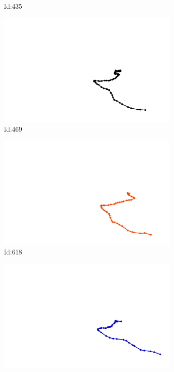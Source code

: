 \documentclass[12pt,twoside]{report}
\begin{document}
\begin{figure}
\begin{subfigure}[b]{0.20\textwidth}
\caption{Id:435}
\end{subfigure}
\begin{subfigure}[b]{0.20\textwidth}
\centering
\includegraphics[width=\textwidth]{../../trajectories/469.png}
\caption{Id:469}
\end{subfigure}
\begin{subfigure}[b]{0.20\textwidth}
\centering
\includegraphics[width=\textwidth]{../../trajectories/618.png}
\caption{Id:618}
\end{subfigure}
\begin{subfigure}[b]{0.20\textwidth}
\centering
\includegraphics[width=\textwidth]{../../trajectories/805.png}

\end{subfigure}
\end{figure}
\end{document}
